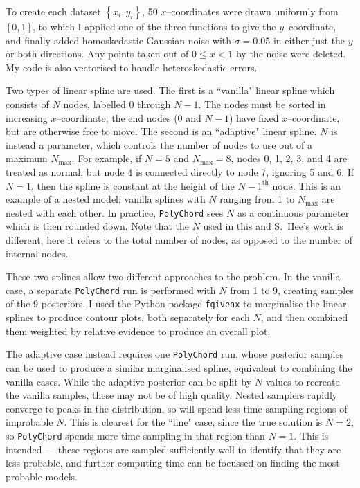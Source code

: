 \documentclass{article}
\begin{document}
To create each dataset $\left\{x_i, y_i\right\}$, 50 $x$--coordinates were drawn uniformly from $\left[0, 1\right]$, to which I applied one of the three functions to give the $y$--coordinate, and finally added homoskedastic Gaussian noise with $\sigma = 0.05$ in either just the $y$ or both directions. Any points taken out of $0\leq x < 1$ by the noise were deleted. My code is also vectorised to handle heteroskedastic errors.

Two types of linear spline are used. The first is a ``vanilla" linear spline which consists of $N$ nodes, labelled $0$ through $N-1$. The nodes must be sorted in increasing $x$--coordinate, the end nodes ($0$ and $N-1$) have fixed $x$--coordinate, but are otherwise free to move. The second is an ``adaptive" linear spline. $N$ is instead a parameter, which controls the number of nodes to use out of a maximum $N_\textrm{max}$. For example, if $N=5$ and $N_\textrm{max}=8$, nodes 0, 1, 2, 3, and 4 are treated as normal, but node 4 is connected directly to node 7, ignoring 5 and 6. If $N=1$, then the spline is constant at the height of the {$N-1^\textrm{th}$} node. This is an example of a nested model; vanilla splines with $N$ ranging from 1 to $N_\textrm{max}$ are nested with each other. In practice, \texttt{PolyChord} sees $N$ as a continuous parameter which is then rounded down. Note that the $N$ used in this and S.~Hee's work is different, here it refers to the total number of nodes, as opposed to the number of internal nodes.

These two splines allow two different approaches to the problem. In the vanilla case, a separate \texttt{PolyChord} run is performed with $N$ from 1 to 9, creating samples of the 9 posteriors. I used the Python package \texttt{fgivenx} to marginalise the linear splines to produce contour plots, both separately for each $N$, and then combined them weighted by relative evidence to produce an overall plot.

The adaptive case instead requires one \texttt{PolyChord} run, whose posterior samples can be used to produce a similar marginalised spline, equivalent to combining the vanilla cases. While the adaptive posterior can be split by $N$ values to recreate the vanilla samples, these may not be of high quality. Nested samplers rapidly converge to peaks in the distribution, so will spend less time sampling regions of improbable $N$. This is clearest for the ``line" case, since the true solution is $N=2$, so \texttt{PolyChord} spends more time sampling in that region than $N=1$. This is intended --- these regions are sampled sufficiently well to identify that they are less probable, and further computing time can be focussed on finding the most probable models.
\end{document}
